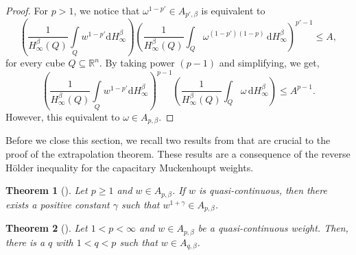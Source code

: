 \documentclass{amsart}
\newtheorem{theorem}{Theorem}
\numberwithin{theorem}{section}
\numberwithin{equation}{section}
\begin{document}
		\begin{proof}
			For $p > 1$, we notice that $\omega^{1-p'} \in A_{p', \beta}$ is equivalent to
			\begin{equation*}
				\left( \frac{1}{H^{\beta}_{\infty} \left( Q \right)} \int\limits_{Q} w^{1 - p'} \mathrm{d}H^{\beta}_{\infty} \right)
				\left( \frac{1}{H_\infty^{\beta}(Q)} \int_Q \omega^{(1-p')(1-p)} \,\mathrm{d}H_\infty^{\beta} \right)^{p'-1} \leq A,
			\end{equation*}
			for every cube $Q \subseteq \mathbb{R}^n$. 
			By taking power $(p-1)$ and simplifying, we get,
			\begin{equation*}
				\left( \frac{1}{H^{\beta}_{\infty} \left( Q \right)} \int\limits_{Q} w^{1 - p'} \mathrm{d}H^{\beta}_{\infty} \right)^{p-1}
				\left( \frac{1}{H_\infty^{\beta}(Q)} \int_Q \omega \,\mathrm{d}H_\infty^{\beta} \right) \leq A^{p - 1}.
			\end{equation*}
			However, this equivalent to $\omega\in A_{p, \beta}.$
		\end{proof}
		Before we close this section, we recall two results from \cite{Huang} that are crucial to the proof of the extrapolation theorem. These results are a consequence of the reverse H\"{o}lder inequality for the capacitary Muckenhoupt weights.
		\begin{theorem}[\cite{Huang}]
			\label{ImprovingPower}
			Let $p \geq 1$ and $w \in A_{p, \beta}$. If $w$ is quasi-continuous, then there exists a positive constant $\gamma$ such that $w^{1 + \gamma} \in A_{p, \beta}$.
		\end{theorem}
		\begin{theorem}[\cite{Huang}]
			\label{SelfImproving}
			Let $1 < p < \infty$ and $w \in A_{p, \beta}$ be a quasi-continuous weight. Then, there is a $q$ with $1 < q < p$ such that $w \in A_{q, \beta}$.
		\end{theorem}
\end{document}
